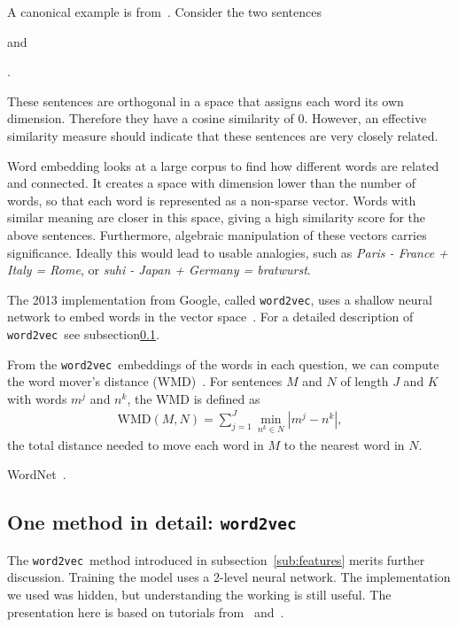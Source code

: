 \documentclass{article} %
\newcommand{\wordtvec}{\texttt{word2vec}}
\begin{document}
A canonical example is from~\cite{kusner15}. Consider the two sentences
\begin{center}
\end{center}
and 
\begin{center}
.
\end{center}
These sentences are orthogonal in a space that assigns each word its own dimension. Therefore they have a cosine similarity of 0. However, an effective similarity measure should indicate that these sentences are very closely related.

Word embedding looks at a large corpus to find how different words are related and connected. It creates a space with dimension lower than the number of words, so that each word is represented as a non-sparse vector. Words with similar meaning are closer in this space, giving a high similarity score for the above sentences. Furthermore, algebraic manipulation of these vectors carries significance. Ideally this would lead to usable analogies, such as \textit{Paris - France + Italy = Rome}, or \textit{suhi - Japan + Germany = bratwurst}.

The 2013 implementation from Google, called \wordtvec, uses a shallow neural network to embed words in the vector space~\cite{word2vec}. For a detailed description of \wordtvec\ see subsection\ref{sub:detail}.

From the \wordtvec\ embeddings of the words in each question, we can compute the word mover's distance (WMD)~\cite{kusner15}. For sentences $M$ and $N$ of length $J$ and $K$ with words $m^j$ and $n^k$, the WMD is defined as 
\begin{align}
\text{WMD}(M,N) = \sum_{j=1}^J\min_{n^k\in N}\left|m^j-n^k\right|,
\end{align}
the total distance needed to move each word in $M$ to the nearest word in $N$.

WordNet~\cite{wordnet}.

\subsection{One method in detail: \wordtvec} \label{sub:detail}

The \wordtvec\ method introduced in subsection~\ref{sub:features} merits further discussion. Training the model uses a 2-level neural network. The implementation we used was hidden, but understanding the working is still useful. The presentation here is based on tutorials from~\cite{tensorflow} and~\cite{mccormick}.
\end{document}
